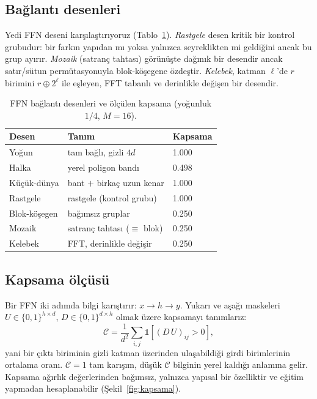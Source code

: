 \documentclass[10pt,journal]{IEEEtran}
\begin{document}
\subsection{Bağlantı desenleri}
Yedi FFN deseni karşılaştırıyoruz (Tablo~\ref{tab:varyant}). \emph{Rastgele} desen kritik bir
kontrol grubudur: bir farkın yapıdan mı yoksa yalnızca seyreklikten mi geldiğini ancak bu grup
ayırır. \emph{Mozaik} (satranç tahtası) görünüşte dağınık bir desendir ancak satır/sütun
permütasyonuyla blok-köşegene özdeştir. \emph{Kelebek}, katman $\ell$'de $r$ birimini
$r \oplus 2^{\ell}$ ile eşleyen, FFT tabanlı ve derinlikle değişen bir desendir.

\begin{table}[!t]
\centering
\footnotesize
\caption{FFN bağlantı desenleri ve ölçülen kapsama (yoğunluk $1/4$, $M{=}16$).}
\label{tab:varyant}
\begin{tabular}{@{}lll@{}}
\toprule
Desen & Tanım & Kapsama \\
\midrule
Yoğun          & tam bağlı, gizli $4d$          & 1.000 \\
Halka          & yerel poligon bandı            & 0.498 \\
Küçük-dünya    & bant $+$ birkaç uzun kenar     & 1.000 \\
Rastgele       & rastgele (kontrol grubu)       & 1.000 \\
Blok-köşegen   & bağımsız gruplar               & 0.250 \\
Mozaik         & satranç tahtası ($\equiv$ blok)& 0.250 \\
Kelebek        & FFT, derinlikle değişir        & 0.250 \\
\bottomrule
\end{tabular}
\end{table}

\subsection{Kapsama ölçüsü}
Bir FFN iki adımda bilgi karıştırır: $x \to h \to y$. Yukarı ve aşağı maskeleri
$U\in\{0,1\}^{h\times d}$, $D\in\{0,1\}^{d\times h}$ olmak üzere kapsamayı tanımlarız:
\begin{equation}
\label{eq:coverage}
\mathcal{C} = \frac{1}{d^2}\sum_{i,j}\mathbb{1}\!\left[(D\,U)_{ij} > 0\right],
\end{equation}
yani bir çıktı biriminin gizli katman üzerinden ulaşabildiği girdi birimlerinin ortalama
oranı. $\mathcal{C}=1$ tam karışım, düşük $\mathcal{C}$ bilginin yerel kaldığı anlamına gelir.
Kapsama ağırlık değerlerinden bağımsız, yalnızca yapısal bir özelliktir ve eğitim yapmadan
hesaplanabilir (Şekil~\ref{fig:kapsama}).
\end{document}
